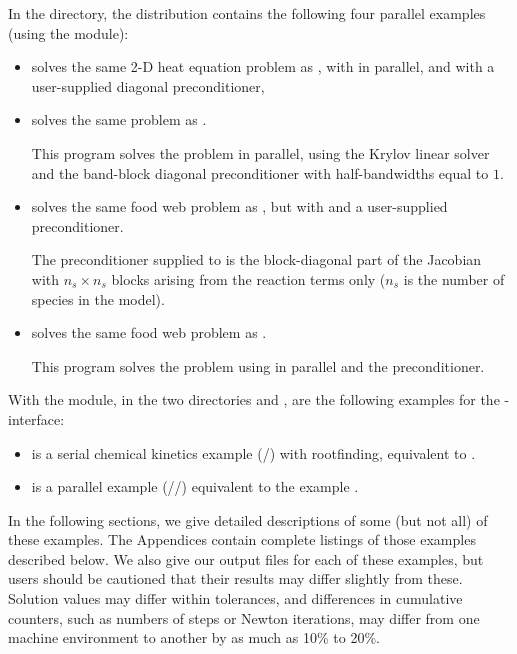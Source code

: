 In the  directory, the {\ida} 
distribution contains the following four parallel examples 
(using the {\nvecp} module):
\begin{itemize}

\item {}
  solves the same 2-D heat equation problem as , with {\idaspgmr}
  in parallel, and with a user-supplied diagonal preconditioner,
  
\item {}
  solves the same problem as .

  This program solves the problem in parallel, using the Krylov linear solver
  {\idaspgmr} and the band-block diagonal preconditioner {\idabbdpre} with
  half-bandwidths equal to $1$.

\item {}
  solves the same food web problem as , but with {\idaspgmr}
  and a user-supplied preconditioner.
  
  The preconditioner supplied to {\idaspgmr} is the block-diagonal part of 
  the Jacobian with $n_s \times n_s$ blocks arising from the reaction terms only
  ($n_s$ is the number of species in the model).

\item {}
  solves the same food web problem as .

  This program solves the problem using {\idaspgmr} in parallel and the
  {\idabbdpre} preconditioner.

\end{itemize}

With the {\fida} module, in the two directories
 and
\newline {}, are the following
examples for the {\F}-{\C} interface:
%
\begin{itemize}
\item {} is a serial chemical kinetics example (/{\dense})
       with rootfinding, equivalent to .

\item {} is a parallel example (/{\spgmr}/{\idabbdpre})
       equivalent to the example .

\end{itemize}

\vspace{0.2in}\noindent 
In the following sections, we give detailed descriptions of some (but
not all) of these examples.  The Appendices contain complete listings
of those examples described below.  We also give our output files for
each of these examples, but users should be cautioned that their
results may differ slightly from these.  Solution
values may differ within tolerances, and differences in cumulative
counters, such as numbers of steps or Newton iterations, may differ
from one machine environment to another by as much as 10\% to 20\%.

